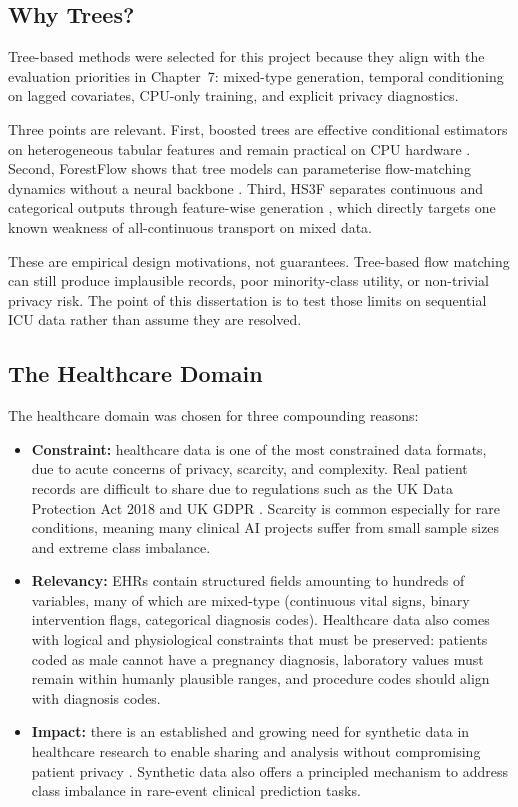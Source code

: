 \subsection{Why Trees?}
Tree-based methods were selected for this project because they align with the evaluation priorities in Chapter~7: mixed-type generation, temporal conditioning on lagged covariates, CPU-only training, and explicit privacy diagnostics.

Three points are relevant. First, boosted trees are effective conditional estimators on heterogeneous tabular features and remain practical on CPU hardware \cite{chen2016xgboost}. Second, ForestFlow shows that tree models can parameterise flow-matching dynamics without a neural backbone \cite{jolicoeur2023forest}. Third, HS3F separates continuous and categorical outputs through feature-wise generation \cite{akazan2024hs3f}, which directly targets one known weakness of all-continuous transport on mixed data.

These are empirical design motivations, not guarantees. Tree-based flow matching can still produce implausible records, poor minority-class utility, or non-trivial privacy risk. The point of this dissertation is to test those limits on sequential ICU data rather than assume they are resolved.

\subsection{The Healthcare Domain}

The healthcare domain was chosen for three compounding reasons:
\begin{itemize}
    \item \textbf{Constraint:} healthcare data is one of the most constrained data formats, due to acute concerns of privacy, scarcity, and complexity. Real patient records are difficult to share due to regulations such as the UK Data Protection Act 2018 and UK GDPR \cite{dataProtectionAct2018,icoResearchSafeguards}. Scarcity is common especially for rare conditions, meaning many clinical AI projects suffer from small sample sizes and extreme class imbalance.
    \item \textbf{Relevancy:} EHRs contain structured fields amounting to hundreds of variables, many of which are mixed-type (continuous vital signs, binary intervention flags, categorical diagnosis codes). Healthcare data also comes with logical and physiological constraints that must be preserved: patients coded as male cannot have a pregnancy diagnosis, laboratory values must remain within humanly plausible ranges, and procedure codes should align with diagnosis codes.
    \item \textbf{Impact:} there is an established and growing need for synthetic data in healthcare research to enable sharing and analysis without compromising patient privacy \cite{kaabachi2025scoping,yan2022benchmarking}. Synthetic data also offers a principled mechanism to address class imbalance in rare-event clinical prediction tasks.
\end{itemize}

